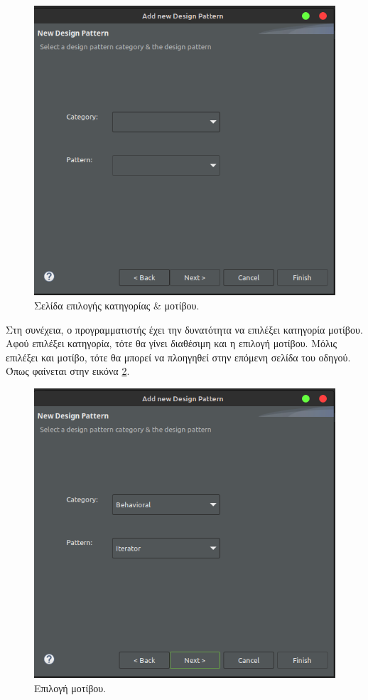 \begin{figure}[H]
    \centering
    \includegraphics[width=1.0\textwidth]{Figures/select_pattern.png}
    \caption{Σελίδα επιλογής κατηγορίας \& μοτίβου.}
    \label{fig:select_pattern}
\end{figure}
Στη συνέχεια, ο προγραμματιστής έχει την δυνατότητα να επιλέξει κατηγορία μοτίβου. Αφού επιλέξει κατηγορία, τότε 
θα γίνει διαθέσιμη και η επιλογή μοτίβου. Μόλις επιλέξει και μοτίβο, τότε θα μπορεί να πλοηγηθεί στην επόμενη σελίδα του οδηγού. 
Όπως φαίνεται στην εικόνα \ref{fig:select_pattern1}.
\begin{figure}[H]
    \centering
    \includegraphics[width=1.0\textwidth]{Figures/select_pattern1.png}
    \caption{Επιλογή μοτίβου.}
    \label{fig:select_pattern1}
\end{figure}

